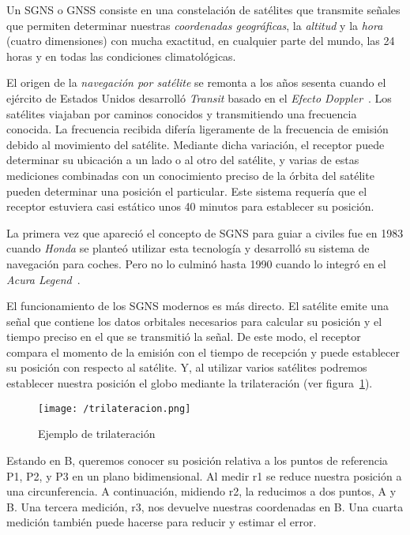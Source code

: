 Un \acs{SGNS} o \acs{GNSS} consiste en una constelación de satélites que transmite señales que
permiten determinar nuestras \emph{coordenadas geográficas}, la \emph{altitud} y la \emph{hora}
(cuatro dimensiones) con mucha exactitud, en cualquier parte del mundo, las 24 horas y en todas las
condiciones climatológicas.

El origen de la \emph{navegación por satélite} se remonta a los años sesenta cuando el ejército de
Estados Unidos desarrolló \emph{Transit} basado en el \emph{Efecto Doppler}~\cite{SN}. Los satélites
viajaban por caminos conocidos y transmitiendo una frecuencia conocida. La frecuencia recibida
difería ligeramente de la frecuencia de emisión debido al movimiento del satélite. Mediante dicha
variación, el receptor puede determinar su ubicación a un lado o al otro del satélite, y varias de
estas mediciones combinadas con un conocimiento preciso de la órbita del satélite pueden determinar
una posición el particular. Este sistema requería que el receptor estuviera casi estático unos 40
minutos para establecer su posición.

La primera vez que apareció el concepto de \acs{SGNS} para guiar a civiles fue en 1983 cuando
\emph{Honda} se planteó utilizar esta tecnología y desarrolló su sistema de navegación para
coches. Pero no lo culminó hasta 1990 cuando lo integró en el \emph{Acura Legend}~\cite{Parra13}.

El funcionamiento de los \acs{SGNS} modernos es más directo. El satélite emite una señal que
contiene los datos orbitales necesarios para calcular su posición y el tiempo preciso en el que se
transmitió la señal. De este modo, el receptor compara el momento de la emisión con el tiempo de
recepción y puede establecer su posición con respecto al satélite. Y, al utilizar varios satélites
podremos establecer nuestra posición el globo mediante la trilateración (ver
figura~\ref{fig:trilateracion}).

\begin{figure}[!h]
  \begin{center}
    \texttt{[image: /trilateracion.png]}
    \caption{Ejemplo de trilateración}
    \label{fig:trilateracion}
  \end{center}
\end{figure}

Estando en B, queremos conocer su posición relativa a los puntos de referencia P1, P2, y P3 en un
plano bidimensional. Al medir r1 se reduce nuestra posición a una circunferencia. A continuación,
midiendo r2, la reducimos a dos puntos, A y B. Una tercera medición, r3, nos devuelve nuestras
coordenadas en B. Una cuarta medición también puede hacerse para reducir y estimar el error.

